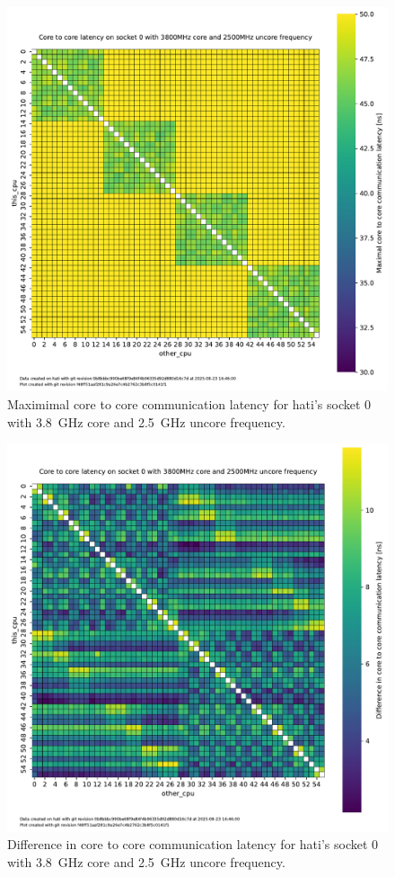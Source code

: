 \begin{figure}[]
    \centering
    \includegraphics[width=\columnwidth]{fig/core-to-core-latency/core-to-core-heatmap-max-3800-2500.pdf}
    \caption{Maximimal core to core communication latency for hati's socket 0 with \SI{3.8}{\GHz} core and \SI{2.5}{\GHz} uncore frequency.}
\end{figure}
\begin{figure}[]
    \centering
    \includegraphics[width=\columnwidth]{fig/core-to-core-latency/core-to-core-heatmap-diff-3800-2500.pdf}
    \caption{Difference in core to core communication latency for hati's socket 0 with \SI{3.8}{\GHz} core and \SI{2.5}{\GHz} uncore frequency.}
\end{figure}